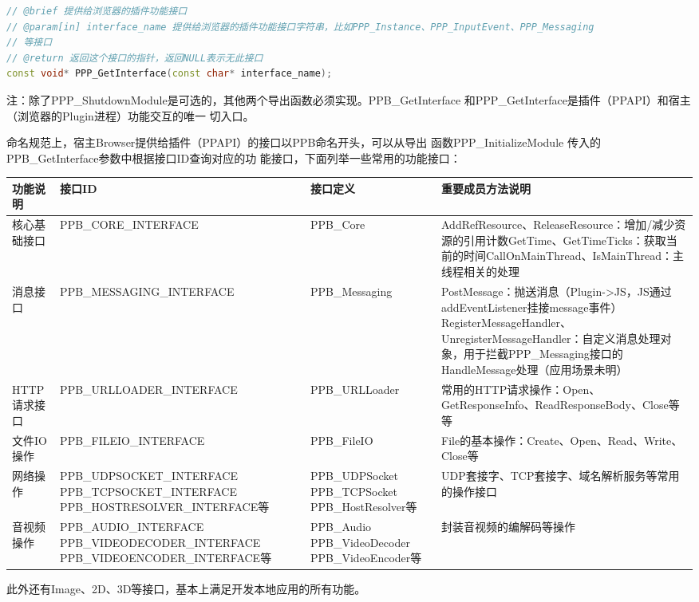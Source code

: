 \begin{spacing}{1.0}
\begin{lstlisting}[language={C++}]
// @brief 提供给浏览器的插件功能接口
// @param[in] interface_name 提供给浏览器的插件功能接口字符串，比如PPP_Instance、PPP_InputEvent、PPP_Messaging
// 等接口
// @return 返回这个接口的指针，返回NULL表示无此接口
const void* PPP_GetInterface(const char* interface_name);
\end{lstlisting}
\end{spacing}

{\color{red}注：除了PPP\_ShutdownModule是可选的，其他两个导出函数必须实现。PPB\_GetInterface
和PPP\_GetInterface是插件（PPAPI）和宿主（浏览器的Plugin进程）功能交互的唯一
切入口。}

\vspace{5ex}
命名规范上，宿主Browser提供给插件（PPAPI）的接口以PPB命名开头，可以从导出
函数PPP\_InitializeModule 传入的PPB\_GetInterface参数中根据接口ID查询对应的功
能接口，下面列举一些常用的功能接口：
\begin{center}
\scriptsize
\begin{tabular}{|l|p{5cm}|p{3cm}|p{5cm}|}
\hline
功能说明 & 接口ID & 接口定义 & 重要成员方法说明 \\
\hline  
核心基础接口 & PPB\_CORE\_INTERFACE & PPB\_Core & AddRefResource、ReleaseResource：增加/减少资源的引用计数GetTime、GetTimeTicks：获取当前的时间CallOnMainThread、IsMainThread：主线程相关的处理 \\
\hline
消息接口 & PPB\_MESSAGING\_INTERFACE & PPB\_Messaging & PostMessage：抛送消息（Plugin->JS，JS通过addEventListener挂接message事件）
RegisterMessageHandler、UnregisterMessageHandler：自定义消息处理对象，用于拦截PPP\_Messaging接口的HandleMessage处理（应用场景未明）\\
\hline
HTTP请求接口 & PPB\_URLLOADER\_INTERFACE & PPB\_URLLoader & 常用的HTTP请求操作：Open、GetResponseInfo、ReadResponseBody、Close等等 \\
\hline
文件IO操作 & PPB\_FILEIO\_INTERFACE & PPB\_FileIO & File的基本操作：Create、Open、Read、Write、Close等 \\
\hline
网络操作 & PPB\_UDPSOCKET\_INTERFACE PPB\_TCPSOCKET\_INTERFACE PPB\_HOSTRESOLVER\_INTERFACE等
& PPB\_UDPSocket PPB\_TCPSocket PPB\_HostResolver等
& UDP套接字、TCP套接字、域名解析服务等常用的操作接口 \\
\hline
音视频操作 & PPB\_AUDIO\_INTERFACE PPB\_VIDEODECODER\_INTERFACE PPB\_VIDEOENCODER\_INTERFACE等
& PPB\_Audio PPB\_VideoDecoder PPB\_VideoEncoder等
& 封装音视频的编解码等操作 \\
\hline
\end{tabular}
\end{center}
此外还有Image、2D、3D等接口，基本上满足开发本地应用的所有功能。

